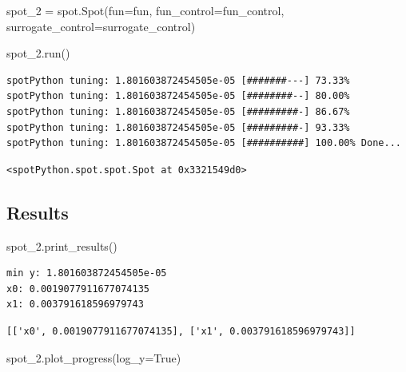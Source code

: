 \documentclass[
  letterpaper,
  DIV=11,
  numbers=noendperiod]{scrreprt}
\newenvironment{Shaded}{\begin{snugshade}}{\end{snugshade}}
\newcommand{\NormalTok}[1]{\textcolor[rgb]{0.00,0.23,0.31}{#1}}
\newcommand{\OperatorTok}[1]{\textcolor[rgb]{0.37,0.37,0.37}{#1}}
\newcommand{\VariableTok}[1]{\textcolor[rgb]{0.07,0.07,0.07}{#1}}
\begin{document}
\begin{Shaded}
\begin{Highlighting}[]
\NormalTok{spot\_2 }\OperatorTok{=}\NormalTok{ spot.Spot(fun}\OperatorTok{=}\NormalTok{fun,}
\NormalTok{                   fun\_control}\OperatorTok{=}\NormalTok{fun\_control,}
\NormalTok{                   surrogate\_control}\OperatorTok{=}\NormalTok{surrogate\_control)}

\NormalTok{spot\_2.run()}
\end{Highlighting}
\end{Shaded}

\begin{verbatim}
spotPython tuning: 1.801603872454505e-05 [#######---] 73.33% 
spotPython tuning: 1.801603872454505e-05 [########--] 80.00% 
spotPython tuning: 1.801603872454505e-05 [#########-] 86.67% 
spotPython tuning: 1.801603872454505e-05 [#########-] 93.33% 
spotPython tuning: 1.801603872454505e-05 [##########] 100.00% Done...
\end{verbatim}

\begin{verbatim}
<spotPython.spot.spot.Spot at 0x3321549d0>
\end{verbatim}

\subsection{Results}\label{results-4}

\begin{Shaded}
\begin{Highlighting}[]
\NormalTok{spot\_2.print\_results()}
\end{Highlighting}
\end{Shaded}

\begin{verbatim}
min y: 1.801603872454505e-05
x0: 0.0019077911677074135
x1: 0.003791618596979743
\end{verbatim}

\begin{verbatim}
[['x0', 0.0019077911677074135], ['x1', 0.003791618596979743]]
\end{verbatim}

\begin{Shaded}
\begin{Highlighting}[]
\NormalTok{spot\_2.plot\_progress(log\_y}\OperatorTok{=}\VariableTok{True}\NormalTok{)}
\end{Highlighting}
\end{Shaded}
\end{document}
